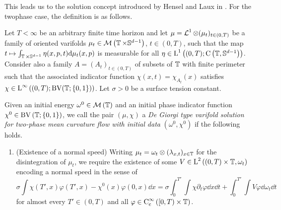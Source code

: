 This leads us to the solution concept introduced by Hensel and Laux in 
\cite{hensel_laux_varifold_solution_concept_for_mean_curvature_flow}.
For the twophase case, the definition is as follows.

\begin{definition}
	Let $ T < \infty $ be an arbitrary finite time horizon and let $ \mu = 
	\operatorname{\mathcal{L}}^{ 1 } \otimes ( \mu_{ t } )_{ t \in ( 0 , T ) } $ be a 
	family of oriented varifolds $ \mu_{ t } \in \mathcal{ M } \left( 
	\operatorname{\mathbb{T}} \times \mathbb{ S }^{ d - 1 } \right) $, $ t \in ( 0 , T ) 
	$, such that the map $ t \mapsto \int_{ \operatorname{\mathbb{T}} \times \mathbb{ S }^{ d 
			-1 } } \eta ( x , p , t ) \dd \mu_{ t } ( x , p ) $ is measurable 
			for all 
	$ \eta \in \operatorname{L}^{ 1 } \left( ( 0 , T ) ; \operatorname{C} \left( \operatorname{\mathbb{T}}, 
	\mathbb{ S 
	}^{ d - 1 } \right) \right) $. 
	Consider also a family $ A = ( A_{ t } )_{ t \in ( 0 , T ) } $ of 
	subsets of $ \operatorname{\mathbb{T}} $ with finite perimeter such that the associated 
	indicator function $ \chi ( x , t ) = \chi_{ A _{ t } } ( x ) $ satisfies 
	$ \chi \in \operatorname{L}^{ \infty } \left( ( 0 , T ) ; \operatorname{BV} ( \operatorname{\mathbb{T}} ; \{ 0 , 
	1 \} ) \right) $.
	Let $ \sigma > 0 $ be a surface tension constant.
	
	Given an initial energy
	$ \omega^{ 0 } \in \mathcal{ M } \left( \operatorname{\mathbb{T}} \right) $ and an initial 
	phase indicator function $ \chi^{ 0 } \in \operatorname{BV} 
	\left( \operatorname{\mathbb{T}} ; \{ 0 , 1 \} \right)$, we call the pair $ ( \mu , \chi ) 
	$ a \emph{De Giorgi type varifold solution for two-phase mean curvature 
	flow 
		with initial data} $ ( \omega^{ 0 } , \chi^{ 0 } ) $ if the following 
		holds.
	\begin{enumerate}
		\item (Existence of a normal speed)
		Writing $ \mu_{ t } = \omega_{ t } \otimes ( \lambda_{ x , t } )_{ x 
			\in \operatorname{\mathbb{T}}} $ for the disintegration of $ \mu_{ t } $, we 
			require 
		the existence of some 
		$ V \in \operatorname{L}^{ 2 } \left( ( 0 , T ) \times \operatorname{\mathbb{T}} ,
		\omega_{ t } \right) $ encoding a normal speed in the sense of
		\begin{equation}
			\label{equation_varifold_velocity}
			\sigma
			\int
			\chi ( T' , x ) \varphi ( T' , x ) 
			-
			\chi^{ 0 } ( x ) \varphi (0,x)
			\dd{ x }
			=
			\sigma
			\int_{ 0 }^{ T' }
			\int
			\chi
			\partial_{ t } \varphi 
			\dd{ x }
			\dd{ t }
			+
			\int_{ 0 }^{ T' }
			\int
			V \varphi 
			\dd{ \omega_{ t } }
			\dd{ t }
		\end{equation}
		for almost every $ T' \in ( 0 , T ) $ and all $ \varphi \in \operatorname{C}_{ 
			\mathrm{c} }^{ \infty } \left( [ 0 , T ) \times \operatorname{\mathbb{T}} \right) 
		$.
		

\end{enumerate}
\end{definition}
